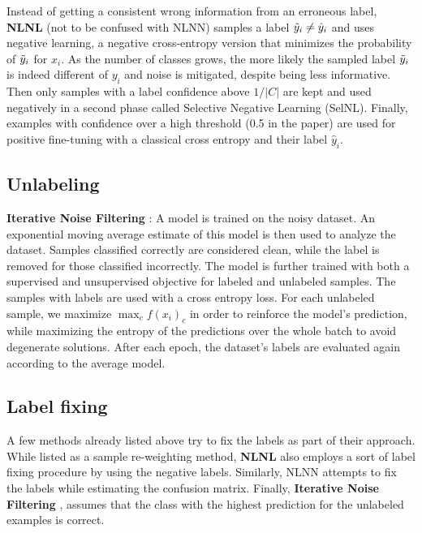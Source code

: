 Instead of getting a consistent wrong information from an erroneous label, \textbf{NLNL} \citep{NLNL} (not to be confused with NLNN) samples a label $\Tilde{y}_i \neq \hat{y}_i$ and uses negative learning, a negative cross-entropy version that minimizes the probability of $\Tilde{y}_i$ for $x_i$. As the number of classes grows, the more likely the sampled label $\Tilde{y}_i$ is indeed different of $y_i$ and noise is mitigated, despite being less informative. Then only samples with a label confidence above $1/|C|$ are kept and used negatively in a second phase called Selective Negative Learning (SelNL). Finally, examples with confidence over a high threshold (0.5 in the paper) are used for positive fine-tuning with a classical cross entropy and their label $\hat{y}_i$.

\subsection{Unlabeling}

\textbf{Iterative Noise Filtering} \citep{IterativeNoiseFiltering}:
A model is trained on the noisy dataset. An exponential moving average estimate of this model is then used to analyze the dataset. Samples classified correctly are considered clean, while the label is removed for those classified incorrectly. The model is further trained with both a supervised and unsupervised objective for labeled and unlabeled samples. The samples with labels are used with a cross entropy loss. For each unlabeled sample, we maximize $\max_c f(x_i)_c$ in order to reinforce the model's prediction, while maximizing the entropy of the predictions over the whole batch to avoid degenerate solutions. After each epoch, the dataset's labels are evaluated again according to the average model. 

\subsection{Label fixing}

A few methods already listed above try to fix the labels as part of their approach. While listed as a sample re-weighting method, \textbf{NLNL} \citep{NLNL} also employs a sort of label fixing procedure by using the negative labels. Similarly, NLNN \citep{NLNN} attempts to fix the labels while estimating the confusion matrix. Finally, \textbf{Iterative Noise Filtering} \citep{IterativeNoiseFiltering}, assumes that the class with the highest prediction for the unlabeled examples is correct.

